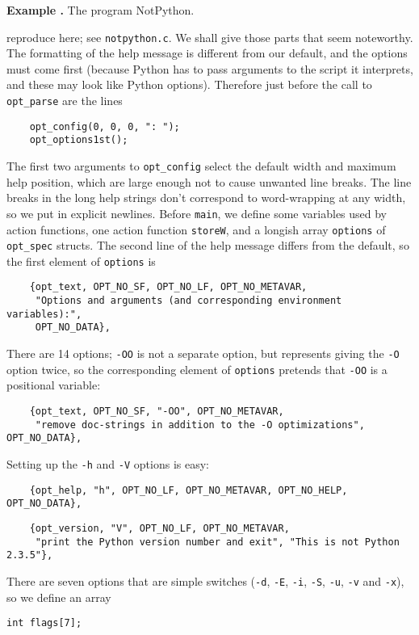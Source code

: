 \documentclass{article}
\newcounter{exnum}
\newenvironment{example}[1]
{\par\smallskip\noindent\refstepcounter{exnum}\textbf{Example
    \theexnum.} The program #1.\par\nopagebreak}
{\par\smallskip}
\renewcommand{\tt}{\texttt}
\begin{document}
\begin{example}{NotPython}
  reproduce here; see \tt{notpython.c}. We shall give those parts that
  seem noteworthy. The formatting of the help message is different
  from our default, and the options must come first (because Python
  has to pass arguments to the script it interprets, and these may
  look like Python options). Therefore just before the call to
  \tt{opt\_parse} are the lines 
{\small
\begin{verbatim}
    opt_config(0, 0, 0, ": ");
    opt_options1st();
\end{verbatim}}
  \noindent The first two arguments to \tt{opt\_config} select the
  default width and maximum help position, which are large enough not
  to cause unwanted line breaks. The line breaks in the long help
  strings don't correspond to word-wrapping at any width, so we put in
  explicit newlines. Before \tt{main}, we define some variables used
  by action functions, one action function \tt{storeW}, and a longish
  array \tt{options} of \tt{opt\_spec} structs. The second line of the
  help message differs from the default, so the first element of
  \tt{options} is 
{\small
\begin{verbatim}
    {opt_text, OPT_NO_SF, OPT_NO_LF, OPT_NO_METAVAR,
     "Options and arguments (and corresponding environment variables):",
     OPT_NO_DATA},
\end{verbatim}}
There are 14 options; \tt{-OO} is not a separate option, but
represents giving the \tt{-O} option twice, so the corresponding
element of \tt{options} pretends that \tt{-OO} is a positional
variable: 
{\small
\begin{verbatim}
    {opt_text, OPT_NO_SF, "-OO", OPT_NO_METAVAR,
     "remove doc-strings in addition to the -O optimizations", OPT_NO_DATA},
\end{verbatim}}
  \noindent Setting up the \tt{-h} and \tt{-V} options is easy:
{\small
\begin{verbatim}
    {opt_help, "h", OPT_NO_LF, OPT_NO_METAVAR, OPT_NO_HELP, OPT_NO_DATA},
\end{verbatim}}
{\small
\begin{verbatim}
    {opt_version, "V", OPT_NO_LF, OPT_NO_METAVAR,
     "print the Python version number and exit", "This is not Python 2.3.5"},
\end{verbatim}}
  \noindent There are seven options that are simple switches (\tt{-d}, \tt{-E},
  \tt{-i}, \tt{-S}, \tt{-u}, \tt{-v} and \tt{-x}), so we define an
  array
{\small
\begin{verbatim}
int flags[7];
\end{verbatim}}

\end{example}
\end{document}
